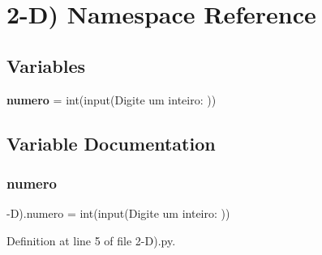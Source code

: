 \section{2-\/D) Namespace Reference}
\label{namespace2-_d_08}
\subsection*{Variables}
\begin{DoxyCompactItemize}
\item 
\textbf{ numero} = int(input(\textquotesingle{}Digite um inteiro\+: \textquotesingle{}))
\end{DoxyCompactItemize}


\subsection{Variable Documentation}
\mbox{\label{namespace2-_d_08_a0a577c5a68e1479e95f9727cc4fccb52}} 
\subsubsection{numero}
{\footnotesize{}-\/D).numero = int(input(\textquotesingle{}Digite um inteiro\+: \textquotesingle{}))}



Definition at line 5 of file 2-\/\+D).\+py.


